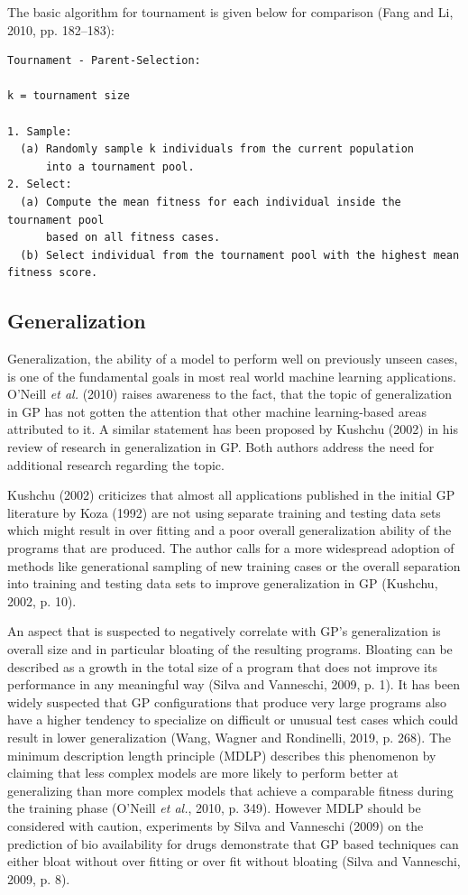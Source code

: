 \documentclass[
  12pt,
]{article}
\begin{document}
The basic algorithm for tournament is given below for comparison (Fang
and Li, 2010, pp. 182--183):

\begin{verbatim}
Tournament - Parent-Selection:

k = tournament size

1. Sample:
  (a) Randomly sample k individuals from the current population
      into a tournament pool.
2. Select:
  (a) Compute the mean fitness for each individual inside the tournament pool
      based on all fitness cases.
  (b) Select individual from the tournament pool with the highest mean fitness score.
\end{verbatim}

\hypertarget{generalization}{%
\subsection{Generalization}\label{generalization}}

Generalization, the ability of a model to perform well on previously
unseen cases, is one of the fundamental goals in most real world machine
learning applications. O'Neill \emph{et al.} (2010) raises awareness to
the fact, that the topic of generalization in GP has not gotten the
attention that other machine learning-based areas attributed to it. A
similar statement has been proposed by Kushchu (2002) in his review of
research in generalization in GP. Both authors address the need for
additional research regarding the topic.

Kushchu (2002) criticizes that almost all applications published in the
initial GP literature by Koza (1992) are not using separate training and
testing data sets which might result in over fitting and a poor overall
generalization ability of the programs that are produced. The author
calls for a more widespread adoption of methods like generational
sampling of new training cases or the overall separation into training
and testing data sets to improve generalization in GP (Kushchu, 2002, p.
10).

An aspect that is suspected to negatively correlate with GP's
generalization is overall size and in particular bloating of the
resulting programs. Bloating can be described as a growth in the total
size of a program that does not improve its performance in any
meaningful way (Silva and Vanneschi, 2009, p. 1). It has been widely
suspected that GP configurations that produce very large programs also
have a higher tendency to specialize on difficult or unusual test cases
which could result in lower generalization (Wang, Wagner and Rondinelli,
2019, p. 268). The minimum description length principle (MDLP) describes
this phenomenon by claiming that less complex models are more likely to
perform better at generalizing than more complex models that achieve a
comparable fitness during the training phase (O'Neill \emph{et al.},
2010, p. 349). However MDLP should be considered with caution,
experiments by Silva and Vanneschi (2009) on the prediction of bio
availability for drugs demonstrate that GP based techniques can either
bloat without over fitting or over fit without bloating (Silva and
Vanneschi, 2009, p. 8).
\end{document}
